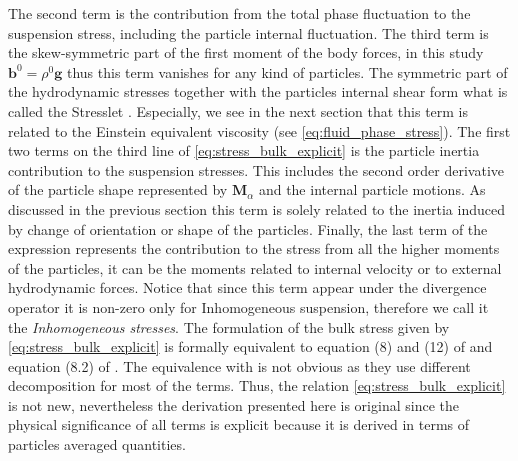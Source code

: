 The second term is the  contribution from the total phase fluctuation to the suspension stress, including the particle internal fluctuation. 
The third term is the skew-symmetric part of the first moment of the body forces, in this study $\textbf{b}^0 = \rho^0 \textbf{g}$ thus this term vanishes for any kind of particles. 
The symmetric part of the hydrodynamic stresses together with the particles internal shear form what is called the Stresslet \citep{pozrikidis1992boundary}. 
Especially, we see in the next section that this term is related to the Einstein equivalent viscosity (see \ref{eq:fluid_phase_stress}). 
The first two terms on the third line of \ref{eq:stress_bulk_explicit} is the particle inertia contribution to the suspension stresses. 
This includes the second order derivative of the particle shape represented by $\textbf{M}_\alpha$ and the internal particle motions. 
As discussed in the previous section this term is solely related to the inertia induced by change of orientation or shape of the particles. 
Finally, the last term of the expression represents the contribution to the stress from all the higher moments of the particles, it can be the moments related to internal velocity or to external hydrodynamic forces.  
Notice that since this term appear under the divergence operator it is non-zero only for Inhomogeneous suspension, therefore we call it the \textit{Inhomogeneous stresses}. 
The formulation of the bulk stress given by \ref{eq:stress_bulk_explicit} is formally equivalent to equation (8) and (12) of \citet{lhuillier1996contribution} and equation (8.2) of \citet{zhang1997momentum}.
The equivalence with \citet{zhang1997momentum} is not obvious as they use different decomposition for most of the terms. 
Thus, the relation \ref{eq:stress_bulk_explicit} is not new, nevertheless the derivation presented here is original since the physical significance of all terms is explicit because it is derived in terms of particles averaged quantities.

